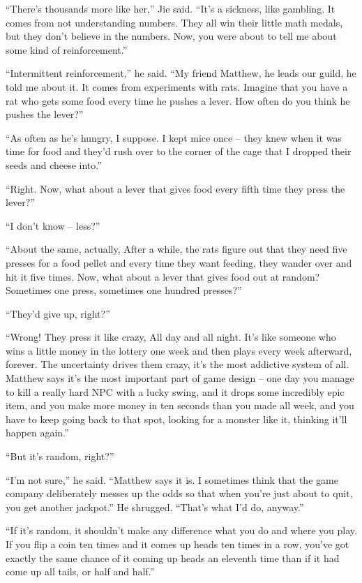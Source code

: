 ``There's thousands more like her,'' Jie said. ``It's a sickness, like
gambling. It comes from not understanding numbers. They all win
their little math medals, but they don't believe in the numbers.
Now, you were about to tell me about some kind of reinforcement.''

``Intermittent reinforcement,'' he said. ``My friend Matthew, he leads
our guild, he told me about it. It comes from experiments with
rats. Imagine that you have a rat who gets some food every time he
pushes a lever. How often do you think he pushes the lever?''

``As often as he's hungry, I suppose. I kept mice once -- they knew
when it was time for food and they'd rush over to the corner of the
cage that I dropped their seeds and cheese into.''

``Right. Now, what about a lever that gives food every fifth time
they press the lever?''

``I don't know -- less?''

``About the same, actually, After a while, the rats figure out that
they need five presses for a food pellet and every time they want
feeding, they wander over and hit it five times. Now, what about a
lever that gives food out at random? Sometimes one press, sometimes
one hundred presses?''

``They'd give up, right?''

``Wrong! They press it like crazy, All day and all night. It's like
someone who wins a little money in the lottery one week and then
plays every week afterward, forever. The uncertainty drives them
crazy, it's the most addictive system of all. Matthew says it's the
most important part of game design -- one day you manage to kill a
really hard NPC with a lucky swing, and it drops some incredibly
epic item, and you make more money in ten seconds than you made all
week, and you have to keep going back to that spot, looking for a
monster like it, thinking it'll happen again.''

``But it's random, right?''

``I'm not sure,'' he said. ``Matthew says it is. I sometimes think
that the game company deliberately messes up the odds so that when
you're just about to quit, you get another jackpot.'' He shrugged.
``That's what I'd do, anyway.''

``If it's random, it shouldn't make any difference what you do and
where you play. If you flip a coin ten times and it comes up heads
ten times in a row, you've got exactly the same chance of it coming
up heads an eleventh time than if it had come up all tails, or half
and half.''

